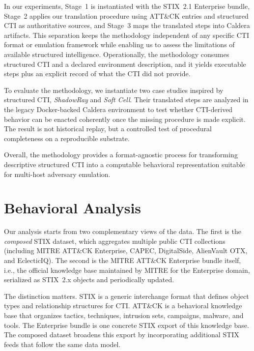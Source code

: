 \documentclass[sigconf]{acmart}
\newcommand{\stix}{STIX\xspace}
\newcommand{\mitre}{MITRE\xspace}
\newcommand{\attack}{ATT\&CK\xspace}
\newcommand{\caldera}{Caldera\xspace}
\begin{document}
In our experiments, Stage~1 is instantiated with the \stix{}~2.1 Enterprise bundle, Stage~2 applies our translation procedure using \attack{} entries and structured CTI as authoritative sources, and Stage~3 maps the translated steps into \caldera{} artifacts. This separation keeps the methodology independent of any specific CTI format or emulation framework while enabling us to assess the limitations of available structured intelligence. Operationally, the methodology consumes structured CTI and a declared environment description, and it yields executable steps plus an explicit record of what the CTI did not provide.

To evaluate the methodology, we instantiate two case studies inspired by structured CTI, \emph{ShadowRay} and \emph{Soft Cell}. Their translated steps are analyzed in the legacy Docker-backed \caldera{} environment to test whether CTI-derived behavior can be enacted coherently once the missing procedure is made explicit. The result is not historical replay, but a controlled test of procedural completeness on a reproducible substrate.

Overall, the methodology provides a format-agnostic process for transforming descriptive structured CTI into a computable behavioral representation suitable for multi-host adversary emulation.

\section{Behavioral Analysis}
\label{sec:analysis}

Our analysis starts from two complementary views of the data. The first is the \emph{composed} \stix{} dataset, which aggregates multiple public CTI collections (including \mitre{} \attack{} Enterprise, CAPEC, DigitalSide, AlienVault OTX, and EclecticIQ). The second is the \mitre{} \attack{} Enterprise bundle itself, i.e., the official knowledge base maintained by \mitre{} for the Enterprise domain, serialized as \stix{}~2.x objects and periodically updated.

The distinction matters. \stix{} is a generic interchange format that defines object types and relationship structures for CTI. \attack{} is a behavioral knowledge base that organizes tactics, techniques, intrusion sets, campaigns, malware, and tools. The Enterprise bundle is one concrete \stix{} export of this knowledge base. The composed dataset broadens this export by incorporating additional \stix{} feeds that follow the same data model.
\end{document}
